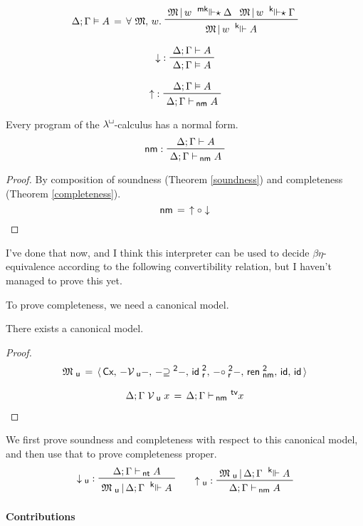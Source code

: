 \documentclass{entcs}
\numberwithin{equation}{thm}
\newcommand{\lambdabox}{\lambda^{\mkern-1mu\sq\mkern-2mu}}
\newcommand{\binop}[1]{-\mathord{#1}-}
\newcommand{\tsf}[1]{\textsf{\upshape{#1}}}
\newcommand{\stsf}[1]{\tsf{\small{#1}}}
\renewcommand{\:}{\mathrel{:}}
\newcommand{\tyrule}[1]{\prftree[l]{${#1} \:\,$}}
\newcommand{\id}{\operatorname{\tsf{id}}}
\newcommand{\comp}{\mathrel{\circ}}
\let\oldforall\forall
\renewcommand{\forall}{\oldforall\,}
\newcommand{\0}{\varnothing}
\newcommand{\geqZ}{\mathrel{\supseteq^{\stsf{2}}}}
\newcommand{\ideZ}{\operatorname{\tsf{id}_{\stsf{r}}^{\stsf{2}}}}
\newcommand{\compeZ}{\mathrel{\circ_{\mkern-1mu\stsf{r}}^{\stsf{2}}}}
\newcommand{\tvar}{\operatorname{^{\stsf{tv}\mkern-4mu}}}
\newcommand{\sq}{\Box}
\newcommand{\Cx}{\tsf{Cx}}
\renewcommand{\e}{\mathrel{\vdash}}
\newcommand{\enm}{\mathrel{\vdash_{\mkern-2mu\stsf{nm}}}}
\newcommand{\ent}{\mathrel{\vdash_{\mkern-2mu\stsf{nt}}}}
\newcommand{\rennmZ}{\operatorname{\tsf{ren}_{\stsf{nm}}^{\stsf{2}}}}
\newcommand{\M}{\mathfrak{M}}
\newcommand{\kee}{\mathrel{^{\stsf{k}\mkern-6mu}\Vdash}}
\newcommand{\kees}{\mathrel{^{\stsf{k}\mkern-6mu}\Vdash\mkern-5mu\star}}
\newcommand{\mkees}{\mathrel{^{\stsf{mk}\mkern-6mu}\Vdash\mkern-5mu\star}}
\newcommand{\eeq}{\mathrel{\vDash}}
\newcommand{\reflect}{\operatorname{\downarrow}}
\newcommand{\Mu}{\mathfrak{M}_{\stsf{u}}}
\newcommand{\Vu}{\mathrel{\mathcal{V}_{\stsf{u}}}}
\newcommand{\reifyu}{\operatorname{\uparrow_{\stsf{u}}}}
\newcommand{\reflectu}{\operatorname{\downarrow_{\stsf{u}}}}
\newcommand{\reify}{\operatorname{\uparrow}}
\newcommand{\nm}{\operatorname{\tsf{nm}}}
\begin{document}
  \[\Delta; \Gamma \eeq A \,=\, \forall \M,\,w.\ \raisebox{-8pt}{$\prftree{\M\,|\,w \mkees \Delta}{\M\,|\,w \kees \Gamma}{\M\,|\,w \kee A}$}\]
\begin{theorem}[Soundness]
  \[\tyrule{\reflect}{\Delta; \Gamma \e A}{\Delta; \Gamma \eeq A}\]
\end{theorem}
\begin{theorem}[Completeness]
  \[\tyrule{\reify}{\Delta; \Gamma \eeq A}{\Delta; \Gamma \enm A}\]
\end{theorem}
\begin{corollary}[Normalisation]
  Every program of the $\lambdabox$-calculus has a normal form.
  \[\tyrule{\nm}{\Delta; \Gamma \e A}{\Delta; \Gamma \enm A}\]
  \begin{proof}\normalshape %
    By composition of soundness (Theorem \ref{soundness}) and completeness (Theorem \ref{completeness}).
    \[\nm \,=\, \reify \comp \reflect\]
  \end{proof}
\end{corollary}\noindent %
I've done that now, and I think this interpreter can be used to decide $\beta\eta$-equivalence according to the following convertibility relation, but I haven't managed to prove this yet.

To prove completeness, we need a canonical model.
\begin{theorem}
  There exists a canonical model.
  \begin{proof}\normalshape %
    \begin{gather*}
      \Mu \,=\, \langle\,\Cx,\,\binop{\Vu},\,\binop{\geqZ},\,\ideZ,\,\binop{\compeZ},\,\rennmZ,\,\id,\,\id\,\rangle\\[0.5\baselineskip]
      \Delta; \Gamma \Vu x \,=\, \Delta; \Gamma \enm \mkern-4mu \tvar x
    \end{gather*}
  \end{proof}
\end{theorem}\noindent %
We first prove soundness and completeness with respect to this canonical model, and then use that to prove completeness proper.
\begin{gather*}
  \tyrule{\reflectu}{\Delta; \Gamma \ent A}{\Mu\,|\,\Delta; \Gamma \kee A}\qquad
  \tyrule{\reifyu}{\Mu\,|\,\Delta; \Gamma \kee A}{\Delta; \Gamma \enm A}
\end{gather*}

\paragraph{Contributions}
\lipsum[1-2]
\end{document}
